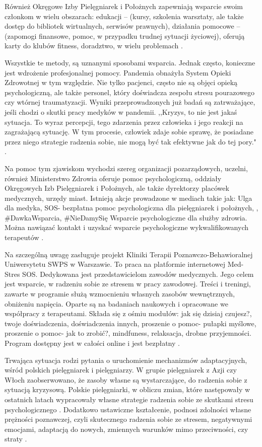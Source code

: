 \documentclass[a4paper,12pt,twoside,openright]{mwrep}
\begin{document}
Również Okręgowe Izby Pielęgniarek i Położnych zapewniają wsparcie swoim członkom w wielu obszarach: edukacji – (kursy, szkolenia warsztaty, ale także dostęp do bibliotek wirtualnych, serwisów prawnych), działania pomocowe – (zapomogi finansowe, pomoc, w przypadku trudnej sytuacji życiowej), oferują karty do klubów fitness, doradztwo, w wielu problemach \cite{izby}.

Wszystkie te metody, są uznanymi sposobami wsparcia. Jednak często, konieczne jest wdrożenie profesjonalnej pomocy. Pandemia obnażyła System Opieki Zdrowotnej w tym względzie. Nie tylko pacjenci, często nie są objęci opieką psychologiczną, ale także personel, który doświadcza zespołu stresu pourazowego czy wtórnej traumatyzacji.  Wyniki przeprowadzonych już badań są zatrważające, jeśli chodzi o skutki pracy medyków w pandemii. ,,Kryzys, to nie jest jakaś sytuacja. To wyraz percepcji, tego zdarzenia przez człowieka i jego reakcji na zagrażającą sytuację. W tym procesie, człowiek zdaje sobie sprawę, że posiadane przez niego strategie radzenia sobie, nie mogą być tak efektywne jak do tej pory." \cite{covid}.

Na pomoc tym zjawiskom wychodzi szereg organizacji pozarządowych, uczelni, również Ministerstwo Zdrowia oferuje pomoc psychologiczną, oddziały Okręgowych Izb Pielęgniarek i Położnych, ale także dyrektorzy placówek medycznych, urzędy miast. Istnieją akcje prowadzone w mediach takie jak: Ulga dla medyka, SOS- bezpłatna pomoc psychologiczna dla pielęgniarek i położnych, , \#DawkaWsparcia, \#NieDamySię Wsparcie psychologiczne dla służby zdrowia. Można nawiązać kontakt i uzyskać wsparcie psychologiczne wykwalifikowanych terapeutów \cite{jak}.

Na szczególną uwagę zasługuje projekt Kliniki Terapii Poznawczo-Behawioralnej Uniwersytetu SWPS w Warszawie. To praca na platformie internetowej Med-Stres SOS. Dedykowana jest przedstawicielom zawodów medycznych. Jego celem jest wsparcie, w radzeniu sobie ze stresem w pracy zawodowej. Treści i treningi, zawarte w programie służą wzmocnieniu własnych zasobów wewnętrznych, obniżeniu napięcia. Oparte są na badaniach naukowych i opracowane we współpracy z terapeutami. Składa się z ośmiu modułów: jak się dzisiaj czujesz?, twoje doświadczenia, doświadczenia innych, proszenie o pomoc- pułapki myślowe, proszenie o pomoc- jak to zrobić?, mindfuness, relaksacja, drobne przyjemności. Program dostępny jest w całości online i jest bezpłatny \cite{projekt}.

Trwająca sytuacja rodzi pytania o uruchomienie mechanizmów adaptacyjnych, wśród polskich pielęgniarek i pielęgniarzy. W grupie pielęgniarek z Azji czy Włoch zaobserwowano, że zasoby własne są wystarczające, do radzenia sobie z sytuacją kryzysową. Polskie pielęgniarki, w obliczu zmian, które następowały w ostatnich latach wypracowały własne strategie radzenia sobie ze skutkami stresu psychologicznego \cite{covid}. Dodatkowo ustawiczne kształcenie, podnosi zdolności własne prężności poznawczej, czyli skutecznego radzenia sobie ze stresem, negatywnymi emocjami, adaptacją do nowych, zmiennych warunków mimo przeciwności, czy straty \cite{preznosc}. 
 
\end{document}
